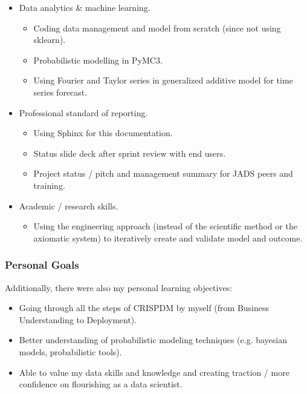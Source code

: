 \documentclass[letterpaper,10pt,english]{sphinxmanual}
\begin{document}
\begin{itemize}
\item {} 
Data analytics \& machine learning.
\begin{itemize}
\item {} 
Coding data management and model from scratch (since not using sklearn).

\item {} 
Probabilistic modelling in PyMC3.

\item {} 
Using Fourier and Taylor series in generalized additive model for time series forecast.

\end{itemize}

\item {} 
Professional standard of reporting.
\begin{itemize}
\item {} 
Using Sphinx for this documentation.

\item {} 
Status slide deck after sprint review with end users.

\item {} 
Project status / pitch and management summary for JADS peers and training.

\end{itemize}

\item {} 
Academic / research skills.
\begin{itemize}
\item {} 
Using the engineering approach (instead of the scientific method or the axiomatic system) to iteratively create and validate model and outcome.

\end{itemize}

\end{itemize}


\subsubsection{Personal Goals}
\label{\detokenize{deployment:personal-goals}}
Additionally, there were also my personal learning objectives:
\begin{itemize}
\item {} 
Going through all the steps of CRISP\sphinxhyphen{}DM by myself (from Business Understanding to Deployment).

\item {} 
Better understanding of probabilistic modeling techniques (e.g. bayesian models, probabilistic tools).

\item {} 
Able to value my data skills and knowledge and creating traction / more confidence on flourishing as a data scientist.

\end{itemize}
\end{document}
